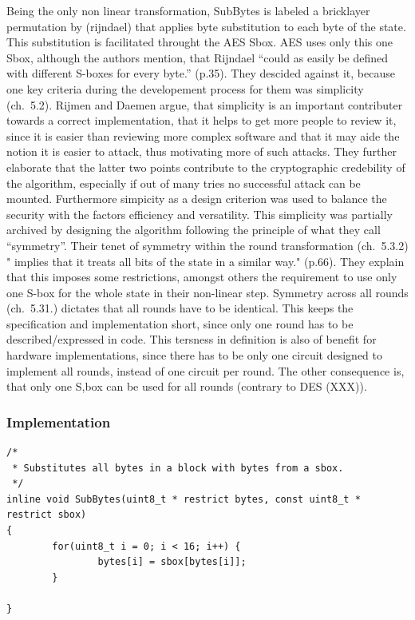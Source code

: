 Being the only non linear transformation, SubBytes is labeled a
bricklayer permutation by (rijndael) that applies byte substitution to
each byte of the state. This substitution is facilitated throught the
AES Sbox. AES uses
only this one Sbox, although the authors mention, that Rijndael ``could
as easily be defined with different S-boxes for every byte.'' (p.35).
They descided against it, because one key criteria during the
developement process for them was simplicity (ch.~5.2). Rijmen and
Daemen argue, that simplicity is an important contributer towards a
correct implementation, that it helps to get more people to review it,
since it is easier than reviewing more complex software and that it may
aide the notion it is easier to attack, thus motivating more of such
attacks. They further elaborate that the latter two points contribute to
the cryptographic credebility of the algorithm, especially if out of
many tries no successful attack can be mounted. Furthermore simpicity as
a design criterion was used to balance the security with the factors
efficiency and versatility. This simplicity was partially archived by
designing the algorithm following the principle of what they call
``symmetry''. Their tenet of symmetry within the round transformation
(ch.~5.3.2) " implies that it treats all bits of the state in a similar
way." (p.66). They explain that this imposes some restrictions, amongst
others the requirement to use only one S-box for the whole state in their
non-linear step. Symmetry across all rounds (ch.~5.31.) dictates that
all rounds have to be identical. This keeps the specification and
implementation short, since only one round has to be described/expressed
in code. This tersness in definition is also of benefit for hardware
implementations, since there has to be only one circuit designed to
implement all rounds, instead of one circuit per round. The other consequence is,
that only one S,box can be used for all rounds
(contrary to DES (XXX)).

\hypertarget{implementation-4}{%
\subsubsection{Implementation}\label{implementation-4}}

\begin{lstlisting}
/*
 * Substitutes all bytes in a block with bytes from a sbox.
 */
inline void SubBytes(uint8_t * restrict bytes, const uint8_t * restrict sbox)
{
        for(uint8_t i = 0; i < 16; i++) {
                bytes[i] = sbox[bytes[i]];
        }
    
}
\end{lstlisting}

